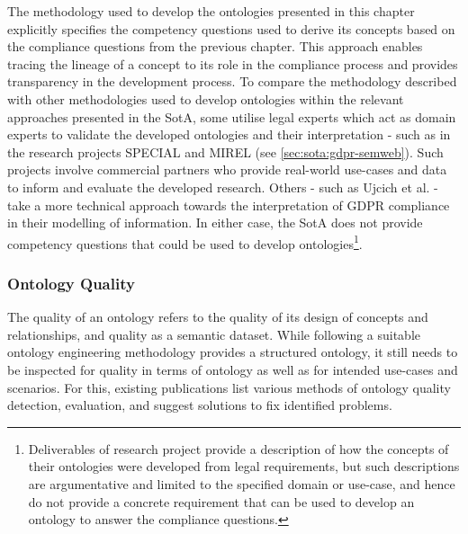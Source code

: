The methodology used to develop the ontologies presented in this chapter explicitly specifies the competency questions used to derive its concepts based on the compliance questions from the previous chapter. This approach enables tracing the lineage of a concept to its role in the compliance process and provides transparency in the development process.
To compare the methodology described with other methodologies used to develop ontologies within the relevant approaches presented in the SotA, some utilise legal experts which act as domain experts to validate the developed ontologies and their interpretation - such as in the research projects SPECIAL and MIREL (see \autoref{sec:sota:gdpr-semweb}). Such projects involve commercial partners who provide real-world use-cases and data to inform and evaluate the developed research.
Others - such as Ujcich et al. \cite{belhajjame_provenance_2018} - take a more technical approach towards the interpretation of GDPR compliance in their modelling of information. In either case, the SotA does not provide competency questions that could be used to develop ontologies\footnote{Deliverables of research project provide a description of how the concepts of their ontologies were developed from legal requirements, but such descriptions are argumentative and limited to the specified domain or use-case, and hence do not provide a concrete requirement that can be used to develop an ontology to answer the compliance questions.}.


\subsubsection*{Ontology Quality}
The quality of an ontology refers to the quality of its design of concepts and relationships, and quality as a semantic dataset. While following a suitable ontology engineering methodology provides a structured ontology, it still needs to be inspected for quality in terms of ontology as well as for intended use-cases and scenarios. For this, existing publications \cite{gurk_towards_2017,vrandecic_ontology_2010} list various methods of ontology quality detection, evaluation, and suggest solutions to fix identified problems.

